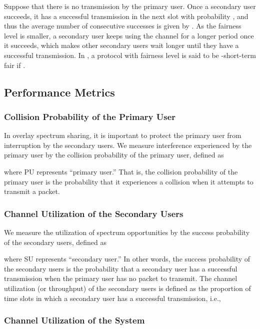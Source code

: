 \documentclass[12pt,draftclsnofoot,onecolumn]{IEEEtran}
\begin{document}
Suppose that there is no transmission by the primary user. Once a secondary user succeeds, it has a successful transmission in the next
slot with probability , and thus the average
number of consecutive successes is given by .
As the fairness level is smaller, a secondary user keeps using
the channel for a longer period once it succeeds, which makes other secondary users wait longer
until they have a successful transmission. In \cite{ma}, a protocol with fairness level 
is said to be -short-term fair if .

\subsection{Performance Metrics}

\subsubsection{Collision Probability of the Primary User}

In overlay spectrum sharing, it is important to protect the
primary user from interruption by the secondary users. We measure
interference experienced by the primary user by the collision probability
of the primary user, defined as

where PU represents ``primary user.'' That is, the collision probability
of the primary user is the probability that it experiences
a collision when it attempts to transmit a packet.

\subsubsection{Channel Utilization of the Secondary Users}

We measure the utilization of spectrum opportunities by
the success probability of the secondary users, defined as

where SU represents ``secondary user.'' In other words, the success probability of the secondary users
is the probability that a secondary user has a successful transmission
when the primary user has no packet to transmit.
The channel utilization (or throughput) of the secondary users is defined as the proportion of
time slots in which a secondary user has a successful transmission, i.e.,


\subsubsection{Channel Utilization of the System}
\end{document}
